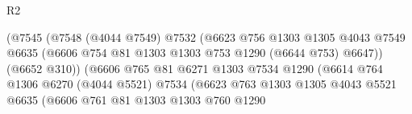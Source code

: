 \begin{lexlean}{R2}
\begin{coremodule}
                                          (@7545
                                            (@7548
                                              (@4044 @7549)
                                              @7532
                                              (@6623
                                                @756
                                                @1303
                                                @1305
                                                @4043
                                                @7549
                                                @6635
                                                (@6606
                                                  @754
                                                  @81
                                                  @1303
                                                  @1303
                                                  @753
                                                  @1290
                                                  (@6644 @753)
                                                  @6647))
                                              (@6652 @310))
                                            (@6606
                                              @765
                                              @81
                                              @6271
                                              @1303
                                              @7534
                                              @1290
                                              (@6614
                                                @764
                                                @1306
                                                @6270
                                                (@4044 @5521)
                                                @7534
                                                (@6623
                                                  @763
                                                  @1303
                                                  @1305
                                                  @4043
                                                  @5521
                                                  @6635
                                                  (@6606
                                                    @761
                                                    @81
                                                    @1303
                                                    @1303
                                                    @760
                                                    @1290

\end{coremodule}
\end{lexlean}
